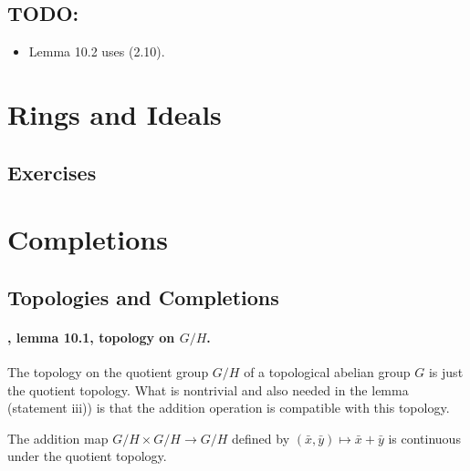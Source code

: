 \documentclass{note}
\begin{document}
\section*{TODO:}

\begin{itemize}
\item Lemma 10.2 uses (2.10).
\end{itemize}


\chapter{Rings and Ideals}

\section*{Exercises}
\setcounter{chapter}{9}


\chapter{Completions}

\section*{Topologies and Completions}
\subsubsection*{, lemma 10.1, topology on $G/H$.}

The topology on the quotient group $G/H$ of a topological abelian
group $G$ is just the quotient topology. What is nontrivial and also
needed in the lemma (statement iii)) is that the addition operation is
compatible with this topology.

\begin{lemma*}
  The addition map $G/H \times G/H \to G/H$ defined by
  $(\bar{x},\bar{y}) \mapsto \bar{x}+\bar{y}$ is continuous under the
  quotient topology.
\end{lemma*}

\end{document}
